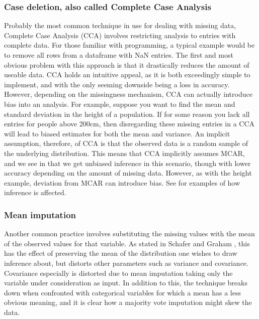 \documentclass{article}
\begin{document}
	\subsubsection{Case deletion, also called Complete Case Analysis}
	Probably the most common technique in use for dealing with missing data, Complete Case Analysis (CCA) involves restricting analysis to entries with complete data. For those familiar with programming, a typical example would be to remove all rows from a dataframe with NaN entries. The first and most obvious problem with this approach is that it drastically reduces the amount of useable data. CCA holds an intuitive appeal, as it is both exceedingly simple to implement, and with the only seeming downside being a loss in accuracy. However, depending on the missingness mechanism, CCA can actually introduce bias into an analysis. For example, suppose you want to find the mean and standard deviation in the height of a population. If for some reason you lack all entries for people above 200cm, then disregarding these missing entries in a CCA will lead to biased estimates for both the mean and variance. An implicit assumption, therefore, of CCA is that the observed data is a random sample of the underlying distribution. This means that CCA implicitly assumes MCAR, and we see in \cite{Schafer2002} that we get unbiased inference in this scenario, though with lower accuracy depending on the amount of missing data. However, as with the height example, deviation from MCAR can introduce bias. See \cite{Schafer2002} for examples of how inference is affected.
	
	\subsubsection{Mean imputation}
	Another common practice involves substituting the missing values with the mean of the observed values for that variable. As stated in Schafer and Graham \cite{Schafer2002}, this has the effect of preserving the mean of the distribution one wishes to draw inference about, but distorts other parameters such as variance and covariance. Covariance especially is distorted due to mean imputation taking only the variable under consideration as input. In addition to this, the technique breaks down when confronted with categorical variables for which a mean has a less obvious meaning, and it is clear how a majority vote imputation might skew the data.
	
	
\end{document}
